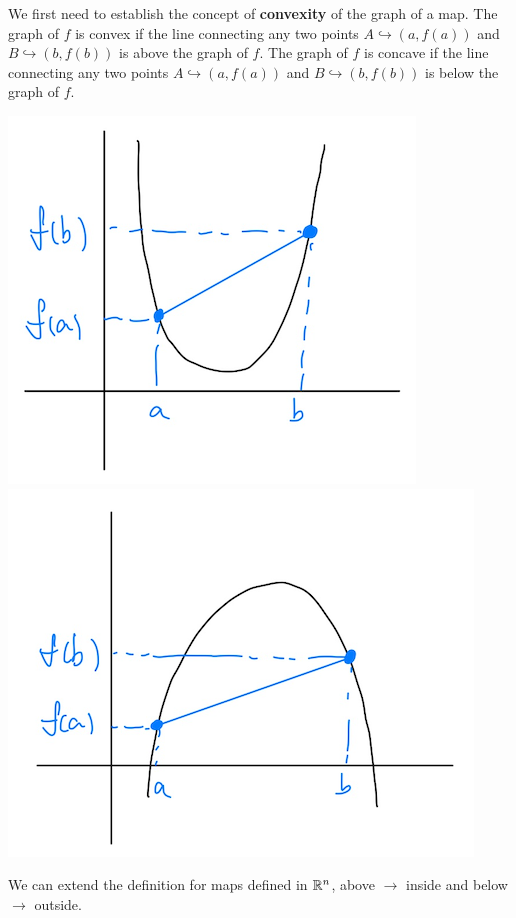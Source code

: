 We first need to establish the concept of \textbf{convexity} of the graph of a map. 
The graph of $f$ is convex if the line connecting any two points $A\hookrightarrow(a, f(a))$ and $B\hookrightarrow(b, f(b))$ is above the graph of $f$.
The graph of $f$ is concave if the line connecting any two points $A\hookrightarrow(a, f(a))$ and $B\hookrightarrow(b, f(b))$ is below the graph of $f$.
\begin{center}
    \includegraphics[scale=0.5]{Images/28.png}
    \includegraphics[scale=0.5]{Images/29.png}
\end{center}
We can extend the definition for maps defined in $\mathbb{R}^n$, above $\to$ inside and below $\to$ outside.


